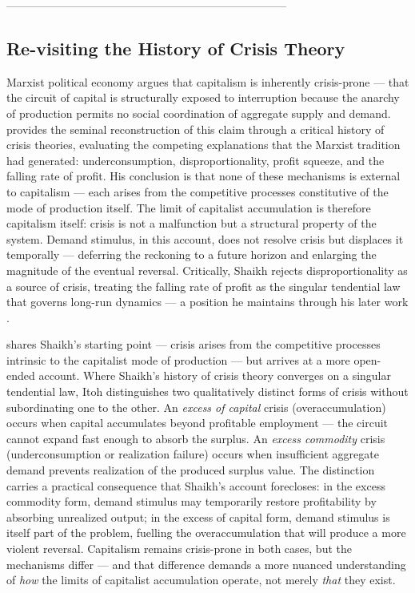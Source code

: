 \documentclass[11pt,a4paper]{article}
\begin{document}
 ---------------------------------------------------------------------------
\subsection{Re-visiting the History of Crisis Theory}
\label{sec:crisis_limit}

Marxist political economy argues that capitalism is inherently crisis-prone --- 
that the circuit of capital is structurally exposed to interruption because the 
anarchy of production permits no social coordination of aggregate supply and 
demand. \citet{Shaikh1978} provides the seminal reconstruction of this claim 
through a critical history of crisis theories, evaluating the competing 
explanations that the Marxist tradition had generated: underconsumption, 
disproportionality, profit squeeze, and the falling rate of profit. His 
conclusion is that none of these mechanisms is external to capitalism --- each 
arises from the competitive processes constitutive of the mode of production 
itself. The limit of capitalist accumulation is therefore capitalism itself: 
crisis is not a malfunction but a structural property of the system. Demand 
stimulus, in this account, does not resolve crisis but displaces it 
temporally --- deferring the reckoning to a future horizon and enlarging the 
magnitude of the eventual reversal. Critically, Shaikh rejects 
disproportionality as a source of crisis, treating the falling rate of profit 
as the singular tendential law that governs long-run dynamics --- a position 
he maintains through his later work \citep{Shaikh2016}.

\citet{Itoh1978} shares Shaikh's starting point --- crisis arises from the 
competitive processes intrinsic to the capitalist mode of production --- but 
arrives at a more open-ended account. Where Shaikh's history of crisis theory 
converges on a singular tendential law, Itoh distinguishes two qualitatively 
distinct forms of crisis without subordinating one to the other. An 
\textit{excess of capital} crisis (overaccumulation) occurs when capital 
accumulates beyond profitable employment --- the circuit cannot expand fast 
enough to absorb the surplus. An \textit{excess commodity} crisis 
(underconsumption or realization failure) occurs when insufficient aggregate 
demand prevents realization of the produced surplus value. The distinction 
carries a practical consequence that Shaikh's account forecloses: in the 
excess commodity form, demand stimulus may temporarily restore profitability 
by absorbing unrealized output; in the excess of capital form, demand 
stimulus is itself part of the problem, fuelling the overaccumulation that 
will produce a more violent reversal. Capitalism remains crisis-prone in 
both cases, but the mechanisms differ --- and that difference demands a more 
nuanced understanding of \textit{how} the limits of capitalist accumulation 
operate, not merely \textit{that} they exist.
\end{document}

